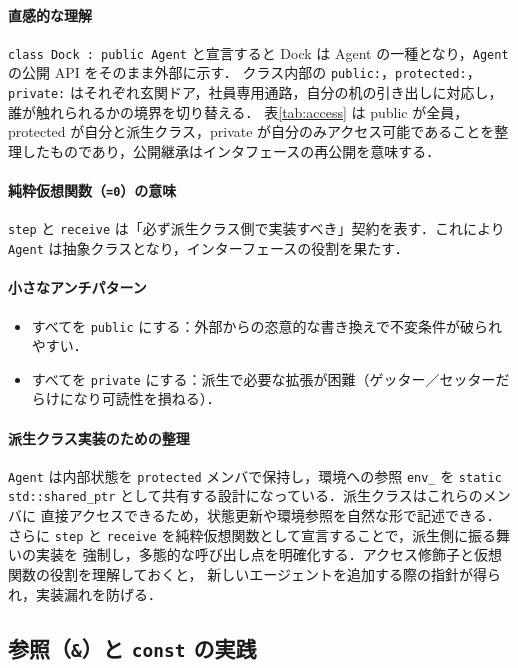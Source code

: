 \documentclass[10pt,letterpaper]{jsarticle}
\begin{document}
\paragraph{直感的な理解}
\verb|class Dock : public Agent| と宣言すると Dock は Agent の一種となり，\texttt{Agent} の公開 API をそのまま外部に示す．
クラス内部の \verb|public:|，\verb|protected:|，\verb|private:| はそれぞれ玄関ドア，社員専用通路，自分の机の引き出しに対応し，誰が触れられるかの境界を切り替える．
表\ref{tab:access} は public が全員，protected が自分と派生クラス，private が自分のみアクセス可能であることを整理したものであり，公開継承はインタフェースの再公開を意味する．

\paragraph{純粋仮想関数（\texttt{=0}）の意味}
\texttt{step} と \texttt{receive} は「必ず派生クラス側で実装すべき」契約を表す．これにより \texttt{Agent} は抽象クラスとなり，インターフェースの役割を果たす．

\paragraph{小さなアンチパターン}
\begin{itemize}
  \item すべてを \texttt{public} にする：外部からの恣意的な書き換えで不変条件が破られやすい．
  \item すべてを \texttt{private} にする：派生で必要な拡張が困難（ゲッター／セッターだらけになり可読性を損ねる）．
\end{itemize}

\paragraph{派生クラス実装のための整理}
\texttt{Agent} は内部状態を \texttt{protected} メンバで保持し，環境への参照 \texttt{env\_} を
\texttt{static std::shared\_ptr} として共有する設計になっている．派生クラスはこれらのメンバに
直接アクセスできるため，状態更新や環境参照を自然な形で記述できる．さらに
\texttt{step} と \texttt{receive} を純粋仮想関数として宣言することで，派生側に振る舞いの実装を
強制し，多態的な呼び出し点を明確化する．アクセス修飾子と仮想関数の役割を理解しておくと，
新しいエージェントを追加する際の指針が得られ，実装漏れを防げる．

\subsection{参照（\texttt{\&}）と \texttt{const} の実践}
\end{document}
